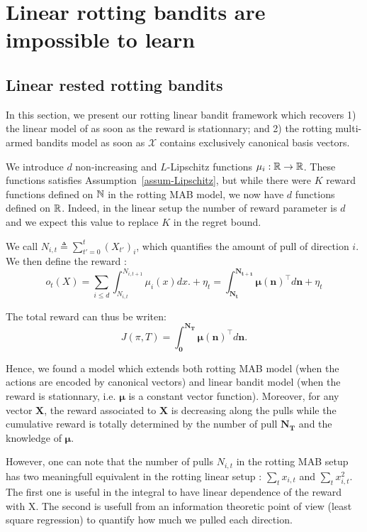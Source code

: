 
\section{Linear rotting bandits are impossible to learn}
\label{Model} 



\subsection{Linear rested rotting bandits}
In this section, we present our rotting linear bandit framework which recovers 1) the linear model of %
 as soon as the reward is stationnary; and 2) the rotting multi-armed bandits model as soon as $\mathcal{X}$ contains exclusively canonical basis vectors. 

We introduce $d$ non-increasing and $L$-Lipschitz functions $\mu_i : \mathbb{R} \rightarrow \mathbb{R}$. These functions satisfies Assumption~\ref{assum-Lipschitz}, but while there were $K$ reward functions defined on ${\mathbb N}$ in the rotting MAB model, we now have $d$ functions defined on $\mathbb{R}$. Indeed, in the linear setup the number of reward parameter is $d$ and we expect this value to replace $K$ in the regret bound.

We call $N_{i,t} \triangleq \sum_{t'=0}^t (X_{t'})_i$, which quantifies the amount of pull of direction $i$. We then define the reward : 
\[
o_t(X) = \sum_{i\leq d} \int_{N_{i,t}}^{N_{i,t+1}} \mu_i(x)dx. +\eta_t 
 = \int_{\bm{N_{t}}}^{\bm{N_{t+1}}} \bm{\mu}(\bm{n})^\intercal  d\bm{n} + \eta_t\]

The total reward can thus be writen:  
\[ J(\pi, T) = \int_{\bm{0}}^{\bm{N_{T}}} \bm{\mu}(\bm{n})^\intercal d\bm{n} .\]

Hence, we found a model which extends both rotting MAB model (when the actions are encoded by canonical vectors) and linear bandit model (when the reward is stationnary, i.e. $\bm{\mu}$ is a constant vector function). Moreover, for any vector $\bm{X}$, the reward associated to $\bm{X}$ is decreasing along the pulls while the cumulative reward is totally determined by the number of pull $\bm{N_T}$ and the knowledge of $\bm{\mu}$.

However, one can note that the number of pulls $N_{i,t}$ in the rotting MAB setup has two meaningfull equivalent in the rotting linear setup : $\sum_t x_{i,t}$ and $\sum_t x_{i,t}^2$. The first one is useful in the integral to have linear dependence of the reward with X. The second is usefull from an information theoretic point of view (least square regression) to quantify how much we pulled each direction.

